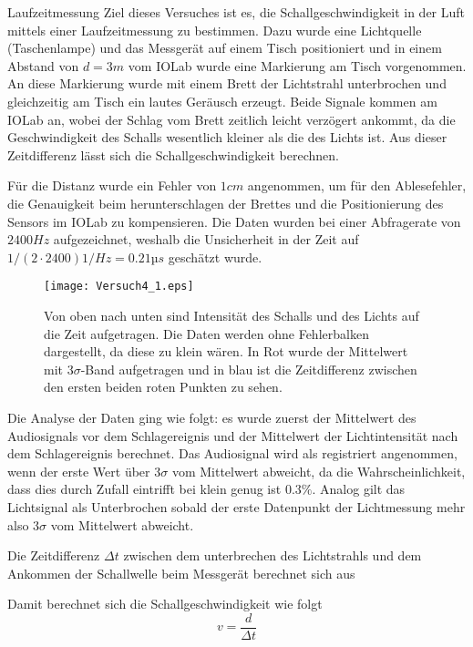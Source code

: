 \documentclass{alex_gp}
\begin{document}
\begin{mybox}{Laufzeitmessung}
	Ziel dieses Versuches ist es, die Schallgeschwindigkeit in der Luft mittels einer Laufzeitmessung zu bestimmen. Dazu wurde eine Lichtquelle (Taschenlampe) und das Messgerät auf einem Tisch positioniert und in einem Abstand von \( d = 3 \unit{m} \) vom IOLab wurde eine Markierung am Tisch vorgenommen. An diese Markierung wurde mit einem Brett der Lichtstrahl unterbrochen und gleichzeitig am Tisch ein lautes Geräusch erzeugt. Beide Signale kommen am IOLab an, wobei der Schlag vom Brett zeitlich leicht verzögert ankommt, da die Geschwindigkeit des Schalls wesentlich kleiner als die des Lichts ist. Aus dieser Zeitdifferenz lässt sich die Schallgeschwindigkeit berechnen. 
	
	Für die Distanz wurde ein Fehler von \( 1 \unit{cm} \) angenommen, um für den Ablesefehler, die Genauigkeit beim herunterschlagen der Brettes und die Positionierung des Sensors im IOLab zu kompensieren. Die Daten wurden bei einer Abfragerate von \( 2400 \unit{Hz} \) aufgezeichnet, weshalb die Unsicherheit in der Zeit auf \( 1/(2\cdot2400) \unit{1/Hz} = 0.21 \unit{µs} \) geschätzt wurde.
	
	\begin{figure}[H]	
		\centering
		\texttt{[image: Versuch4\_1.eps]}
		\caption{Von oben nach unten sind Intensität des Schalls und des Lichts auf die Zeit aufgetragen. Die Daten werden ohne Fehlerbalken dargestellt, da diese zu klein wären. In Rot wurde der Mittelwert mit \( 3\sigma \)-Band aufgetragen und in blau ist die Zeitdifferenz zwischen den ersten beiden roten Punkten zu sehen.}
		\label{fig:laufzeit}
	\end{figure}

	Die Analyse der Daten ging wie folgt: es wurde zuerst der Mittelwert des Audiosignals vor dem Schlagereignis und der Mittelwert der Lichtintensität nach dem Schlagereignis berechnet. Das Audiosignal wird als registriert angenommen, wenn der erste Wert über \( 3\sigma \) vom Mittelwert abweicht, da die Wahrscheinlichkeit, dass dies durch Zufall eintrifft bei klein genug ist \( 0.3 \% \). Analog gilt das Lichtsignal als Unterbrochen sobald der erste Datenpunkt der Lichtmessung mehr also \( 3\sigma \) vom Mittelwert abweicht. 
	
	Die Zeitdifferenz \( \Delta t \) zwischen dem unterbrechen des Lichtstrahls und dem Ankommen der Schallwelle beim Messgerät berechnet sich aus 
	
	Damit berechnet sich die Schallgeschwindigkeit wie folgt
	\begin{equation}\label{eqn:v1}
		v = \frac{d}{\Delta t}
	\end{equation}
	

\end{mybox}
\end{document}
